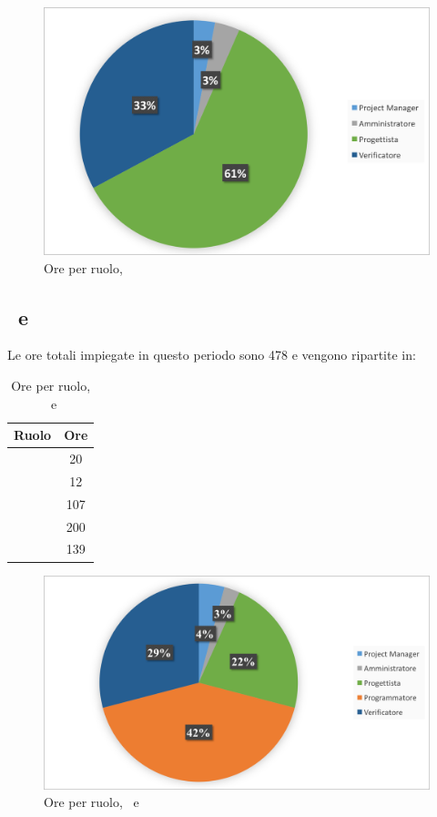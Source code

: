 \begin{figure}[H]
	\centering 
	\includegraphics[scale=0.7]{Immagini/GraficiTorte/PA.png}
	\caption{Ore per ruolo, \PA}
\end{figure}

\newpage
\subsection{\PD\ e \COD}
Le ore totali impiegate in questo periodo sono 478 e vengono ripartite in:

\begin{table}[h]
	\begin{center}
		\begin{tabular}{|c|c|}
			\hline
			\textbf{Ruolo}	& \textbf{Ore} \\
			\hline
			\Pm &	20\\
			\hline
			\Am	&	12\\
			\hline
			\Prog	&	107\\
			\hline
			\Progr	&	200\\
			\hline
			\Ver	&	139\\
			\hline
		\end{tabular}
	\end{center}
	\caption{Ore per ruolo, \PD\ e \COD}
\end{table}

\begin{figure}[H]
	\centering 
	\includegraphics[scale=0.7]{Immagini/GraficiTorte/PDCOD.png}
	\caption{Ore per ruolo, \PD\ e \COD}
\end{figure}

